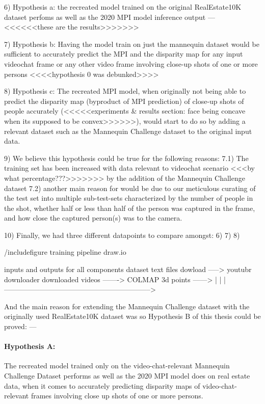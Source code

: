 6) Hypothesis a: the recreated model trained on the original RealEstate10K dataset perfoms as well as the 2020 MPI model inference output --- <<<<<<these are the results>>>>>>> 

7) Hypothesis b: Having the model train on just the mannequin dataset would be sufficient to accurately predict the MPI and the disparity map for any input videochat frame or any other video frame involving close-up shots of one or more persons <<<<hypothesis 0 was debunked>>>>

8) Hypothesis c: The recreated MPI model, when originally not being able to predict the disparity map (byproduct of MPI prediction) of close-up shots of people accurately (<<<<<experiments & results section: face being concave when its supposed to be convex>>>>>>), would start to do so by adding a relevant dataset such as the Mannequin Challenge dataset to the original input data.

9) We believe this hypothesis could be true for the following reasons: 
    7.1) The training set has been increased with data relevant to videochat scenario <<<by what percentage???>>>>>>> by the addition of the Mannequin Challenge dataset
    7.2) another main reason for would be due to our meticulous curating of the test set into multiple sub-test-sets characterized by the number of people in the shot, whether half or less than half of the person was captured in the frame, and how close the captured person(s) was to the camera.

10) Finally, we had three different datapoints to compare amongst: 6) 7) 8)



 
/include{figure} training pipeline 
draw.io


inputs and outputs for all components 
dataset text files dowload -----> youtubr downloader downloaded videos -------> COLMAP 3d points ------> 
                                        |
                                        |
                                        |-------------------------------------------------------------->




And the main reason for extending the Mannequin Challenge dataset with the originally used RealEstate10K dataset was so Hypothesis B of this thesis could be proved: ---

\paragraph{Hypothesis A:}
The recreated model trained only on the video-chat-relevant Mannequin Challenge Dataset performs as well as the 2020 MPI model does on real estate data, when it comes to accurately predicting disparity maps of video-chat-relevant frames involving close up shots of one or more persons.

